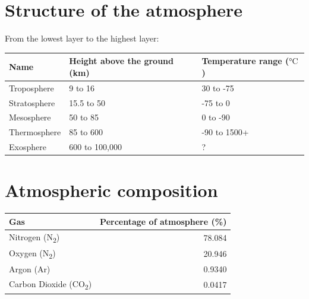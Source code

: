 \documentclass[11pt]{article}
\begin{document}
\section{Structure of the atmosphere}
\label{sec:org0caff72}
From the lowest layer to the highest layer:
\begin{center}
\begin{tabular}{l|l|l}
Name & Height above the ground (km) & Temperature range (\(\unit{\degreeCelsius}\))\\[0pt]
\hline
Troposphere & 9 to 16 & 30 to -75\\[0pt]
Stratosphere & 15.5 to 50 & -75 to 0\\[0pt]
Mesosphere & 50 to 85 & 0 to -90\\[0pt]
Thermosphere & 85 to 600 & -90 to 1500+\\[0pt]
Exosphere & 600 to 100,000 & ?\\[0pt]
\end{tabular}
\end{center}

\newpage

\section{Atmospheric composition}
\label{sec:orgeae384e}
\begin{center}
\begin{tabular}{l|r}
Gas & Percentage of atmosphere (\%)\\[0pt]
\hline
Nitrogen (N\textsubscript{2}) & 78.084\\[0pt]
Oxygen (N\textsubscript{2}) & 20.946\\[0pt]
Argon (Ar) & 0.9340\\[0pt]
Carbon Dioxide (CO\textsubscript{2}) & 0.0417\\[0pt]
\end{tabular}
\end{center}
\end{document}
